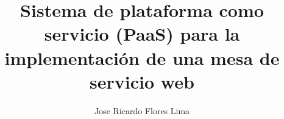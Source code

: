 \documentclass[twoside,11pt]{Latex/Classes/PhDthesisPSnPDF}
\title{Sistema de plataforma como servicio (PaaS) para la implementación de 
	una mesa de servicio web}
\author{Jose Ricardo Flores Lima}
\begin{document}
\begin{titlepage}
\maketitle
\end{titlepage}


\setcounter{secnumdepth}{3} %
\setcounter{tocdepth}{3}    %
\tableofcontents            %
\listoffigures              %
\listoftables               %


\mainmatter
 

\def\baselinestretch{1.5}                   %
\end{document}
